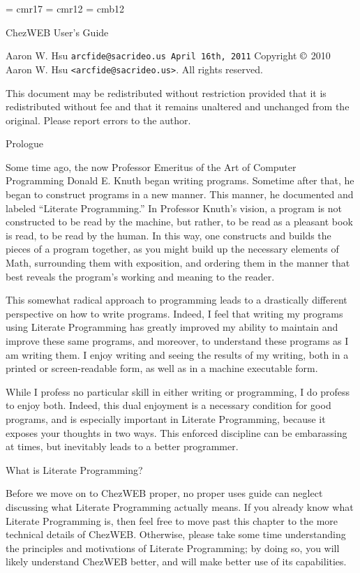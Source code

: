 

\font\titlefnt = cmr17
\font\big = cmr12
\font\bigbf = cmb12

\def\heading#1{{\bigbf\bigskip\noindent #1\par\medskip}\noindent}

\null\vskip 3in
\centerline{\titlefnt ChezWEB User's Guide}
\vskip 1in
{\center Aaron W. Hsu
\tt arcfide@sacrideo.us
April 16th, 2011}
\vfill
\noindent
Copyright $\copyright$ 2010 Aaron W. Hsu {\tt <arcfide@sacrideo.us>}. All rights reserved.\par
\noindent
This document may be redistributed without restriction provided that it is redistributed without fee and that it remains unaltered and unchanged from the original. Please report errors to the author.
\vfil\break

\doublecolumns

\heading{Prologue}%
Some time ago, the now Professor Emeritus of the Art of Computer
Programming Donald E. Knuth began writing programs.  Sometime after
that, he began to construct programs in a new manner.  This manner, he
documented and labeled ``Literate Programming.'' In Professor Knuth's
vision, a program is not constructed to be read by the machine, but
rather, to be read as a pleasant book is read, to be read by the
human.  In this way, one constructs and builds the pieces of a program
together, as you might build up the necessary elements of Math,
surrounding them with exposition, and ordering them in the manner that
best reveals the program's working and meaning to the reader.

This somewhat radical approach to programming leads to a drastically
different perspective on how to write programs.  Indeed, I feel that
writing my programs using Literate Programming has greatly improved my
ability to maintain and improve these same programs, and moreover, to
understand these programs as I am writing them.  I enjoy writing and
seeing the results of my writing, both in a printed or screen-readable
form, as well as in a machine executable form.

While I profess no particular skill in either writing or programming,
I do profess to enjoy both.  Indeed, this dual enjoyment is a
necessary condition for good programs, and is especially important in
Literate Programming, because it exposes your thoughts in two ways.
This enforced discipline can be embarassing at times, but inevitably
leads to a better programmer.

\heading{What is Literate Programming?}%
Before we move on to ChezWEB proper, no proper uses guide can
neglect discussing what Literate Programming actually means.  If you
already know what Literate Programming is, then feel free to move past
this chapter to the more technical details of ChezWEB.  Otherwise,
please take some time understanding the principles and motivations of
Literate Programming; by doing so, you will likely understand ChezWEB
better, and will make better use of its capabilities.

